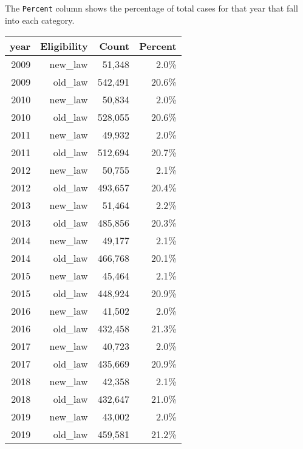 \documentclass[
]{article}
\begin{document}
The \texttt{Percent} column shows the percentage of total cases for that
year that fall into each category.

\begin{longtable}[]{@{}rrrr@{}}
\toprule
year & Eligibility & Count & Percent \\
\midrule
\endhead
2009 & new\_law & 51,348 & 2.0\% \\
2009 & old\_law & 542,491 & 20.6\% \\
2010 & new\_law & 50,834 & 2.0\% \\
2010 & old\_law & 528,055 & 20.6\% \\
2011 & new\_law & 49,932 & 2.0\% \\
2011 & old\_law & 512,694 & 20.7\% \\
2012 & new\_law & 50,755 & 2.1\% \\
2012 & old\_law & 493,657 & 20.4\% \\
2013 & new\_law & 51,464 & 2.2\% \\
2013 & old\_law & 485,856 & 20.3\% \\
2014 & new\_law & 49,177 & 2.1\% \\
2014 & old\_law & 466,768 & 20.1\% \\
2015 & new\_law & 45,464 & 2.1\% \\
2015 & old\_law & 448,924 & 20.9\% \\
2016 & new\_law & 41,502 & 2.0\% \\
2016 & old\_law & 432,458 & 21.3\% \\
2017 & new\_law & 40,723 & 2.0\% \\
2017 & old\_law & 435,669 & 20.9\% \\
2018 & new\_law & 42,358 & 2.1\% \\
2018 & old\_law & 432,647 & 21.0\% \\
2019 & new\_law & 43,002 & 2.0\% \\
2019 & old\_law & 459,581 & 21.2\% \\
\bottomrule
\end{longtable}
\end{document}
